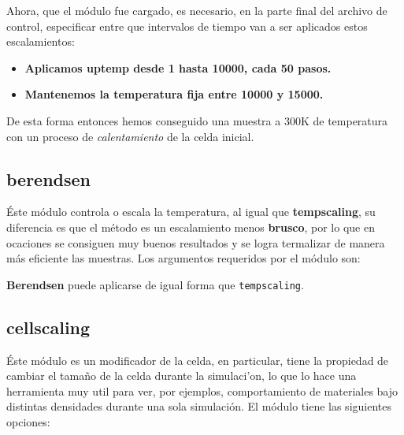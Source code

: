 Ahora, que el m\'odulo fue cargado, es necesario, en la parte final del archivo de control, especificar entre que intervalos de tiempo van a ser aplicados estos escalamientos:

\begin{itemize}
 \item \textbf{Aplicamos \textbf{uptemp} desde 1 hasta 10000, cada 50 pasos.}
 \item \textbf{Mantenemos la temperatura fija entre 10000 y 15000.}
\end{itemize}

De esta forma entonces hemos conseguido una muestra a 300K de temperatura con un proceso de \textit{calentamiento} de la celda inicial.

\subsection{berendsen}
\'Este m\'odulo controla o escala la temperatura, al igual que \textbf{tempscaling}, su diferencia es que el m\'etodo es un escalamiento menos \textbf{brusco}, por lo que en ocaciones se consiguen muy buenos resultados y se logra termalizar de manera m\'as eficiente las muestras. Los argumentos requeridos por el m\'odulo son:


\textbf{Berendsen} puede aplicarse de igual forma que \verb|tempscaling|.

\subsection{cellscaling}
\'Este m\'odulo es un modificador de la celda, en particular, tiene la propiedad de cambiar el tama\~no de la celda durante la simulaci'on, lo que lo hace una herramienta muy util para ver, por ejemplos, comportamiento de materiales bajo distintas densidades durante una sola simulaci\'on. El m\'odulo tiene las siguientes opciones:


